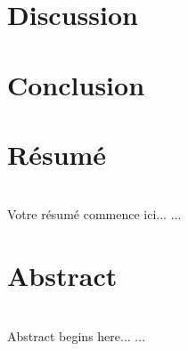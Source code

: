 \documentclass[12pt,a4paper]{article}
\begin{document}
\section{Discussion}
\section{Conclusion}


%
% 
%
%
%
% 
% 

\newpage 
\thispagestyle{empty}
\section*{Résumé}~\\[0.2cm]
Votre résumé commence ici...
   ...
\section*{Abstract}~\\[0.2cm]
 Abstract begins here...
   ...
\end{document}

